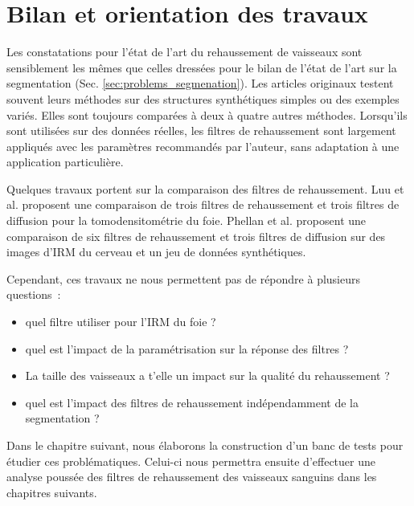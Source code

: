 \section{Bilan et orientation des travaux}
\label{sec:EA:bilan}
Les constatations pour l'état de l'art du rehaussement de vaisseaux sont sensiblement les mêmes que celles dressées pour le bilan de l'état de l'art sur la segmentation (Sec. \ref{sec:problems_segmenation}). Les articles originaux testent souvent leurs méthodes sur des structures synthétiques simples ou des exemples variés. Elles sont toujours comparées à deux à quatre autres méthodes. Lorsqu'ils sont utilisées sur des données réelles, les filtres de rehaussement sont largement appliqués avec les paramètres recommandés par l'auteur, sans adaptation à une application particulière.

Quelques travaux portent sur la comparaison des filtres de rehaussement. Luu et al. \cite{Luu2015_liver_vesselness_comparison} proposent une comparaison de trois filtres de rehaussement et trois filtres de diffusion pour la tomodensitométrie du foie. Phellan et al. \cite{Phellan2017_Brain_vesselness_comparison} proposent une comparaison de six filtres de rehaussement et trois filtres de diffusion sur des images d'IRM du cerveau et un jeu de données synthétiques.

Cependant, ces travaux ne nous permettent pas de répondre à plusieurs questions~:
\begin{itemize}
\item quel filtre utiliser pour l'IRM du foie ?
\item quel est l'impact de la paramétrisation sur la réponse des filtres ?
\item La taille des vaisseaux a t'elle un impact sur la qualité du rehaussement ?
\item quel est l'impact des filtres de rehaussement indépendamment de la segmentation ?
\end{itemize}
Dans le chapitre suivant, nous élaborons la construction d'un banc de tests pour étudier ces problématiques. Celui-ci nous permettra ensuite d'effectuer une analyse poussée des filtres de rehaussement des vaisseaux sanguins dans les chapitres suivants.








